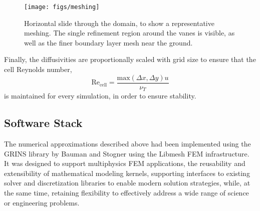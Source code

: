   \begin{figure}[!htb]
    \begin{center}
     \texttt{[image: figs/meshing]}
     \caption{Horizontal slide through the domain, to show a
     representative meshing. The single refinement region around the
     vanes is visible, as well as the finer boundary layer mesh near the
     ground.}
     \label{fig:meshing}
    \end{center}
  \end{figure}

Finally, the diffusivities are proportionally
scaled with grid size to ensure that the cell Reynolds number, 
\begin{equation}
 \text{Re}_\text{cell} = \frac{\text{max}(\Delta x,\Delta y) u}{\nu_T}
\end{equation}
 is maintained for every simulation, in order to ensure stability.




\subsection{Software Stack}

The numerical approximations described above had been implemented using
the GRINS library\cite{GRINSpaper} by Bauman and Stogner using the
Libmesh\cite{libMeshPaper} FEM infrastructure. It was designed to
support multiphysics FEM applications, the reusability and extensibility
of mathematical modeling kernels, supporting interfaces to existing
solver and discretization libraries to enable modern solution
strategies, while, at the same time, retaining flexibility to
effectively address a wide range of science or engineering problems.  

